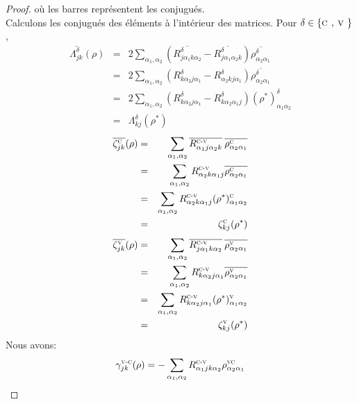 \documentclass[12pt,a4paper,openany,oneside]{book}
\begin{document}
{{{{{{\begin{proof}
  où les barres représentent les conjugués. \\
  Calculons les conjugués des éléments à l'intérieur des matrices.
  Pour $ \delta\in\{\textsc{c , v }\} $ ,
 \begin{eqnarray*}
\overline{\Lambda^{\delta}_{jk}}(\rho) & = & 2\sum_{\alpha_{1},\alpha_{2}}\left(\overline{R^{\delta}_{j\alpha_{1}k\alpha_{2}}}-\overline{R^{\delta}_{j\alpha_{1}\alpha_{2}k}}\right)\overline{\rho^{\delta}_{\alpha_{2}\alpha_{1}}}\\
& = & 2\sum_{\alpha_{1},\alpha_{2}}(R^{\delta}_{k\alpha_{2}j\alpha_{1}}-R^{\delta}_{\alpha_{2}kj\alpha_{1}})\overline{\rho^{\delta}_{\alpha_{2}\alpha_{1}}}\\ 
& = & 2\sum_{\alpha_{1},\alpha_{2}}(R^{\delta}_{k\alpha_{2}j\alpha_{1}}-R^{\delta}_{k\alpha_{2}\alpha_{1}j})(\rho^{*})^{\delta}_{\alpha_{1}\alpha_{2}}\\
 & = & \Lambda^{\delta}_{kj}(\rho^{*})
\end{eqnarray*}  
 \begin{eqnarray*}
\overline{\zeta^{\textsc{c}}_{jk}}(\rho) & = & \displaystyle\sum_{\alpha_{1},\alpha_{2}}\overline{R^{\textsc{c-v}}_{\alpha_{1}j\alpha_{2}k}}\:\overline{\rho^{\textsc{c}}_{\alpha_{2}\alpha_{1}}}\\
& = & \displaystyle\sum_{\alpha_{1},\alpha_{2}}R^{\textsc{c-v}}_{\alpha_{2}k\alpha_{1}j}\overline{\rho^{\textsc{c}}_{\alpha_{2}\alpha_{1}}}\\
& = & \displaystyle\sum_{\alpha_{1},\alpha_{2}}R^{\textsc{c-v}}_{\alpha_{2}k\alpha_{1}j}(\rho^{*})^{\textsc{c}}_{\alpha_{1}\alpha_{2}}\\
& = & \zeta^{\textsc{c}}_{kj}(\rho^{*})
\end{eqnarray*}   
%  
\begin{eqnarray*}
\overline{\zeta^{\textsc{v}}_{jk}}(\rho) & = & \displaystyle\sum_{\alpha_{1},\alpha_{2}}\overline{R^{\textsc{c-v}}_{j\alpha_{1}k\alpha_{2}}}\:\overline{\rho^{\textsc{v}}_{\alpha_{2}\alpha_{1}}}\\
& = & \displaystyle\sum_{\alpha_{1},\alpha_{2}}R^{\textsc{c-v}}_{k\alpha_{2}j\alpha_{1}}\overline{\rho^{\textsc{v}}_{\alpha_{2}\alpha_{1}}}\\
& = & \displaystyle\sum_{\alpha_{1},\alpha_{2}}R^{\textsc{c-v}}_{k\alpha_{2}j\alpha_{1}}(\rho^{*})^{\textsc{v}}_{\alpha_{1}\alpha_{2}}\\
& = & \zeta^{\textsc{v}}_{kj}(\rho^{*})
\end{eqnarray*} 
%
Nous avons:  
$$
\gamma^{\textsc{v-c}}_{jk}(\rho) = -\displaystyle\sum_{\alpha_{1},\alpha_{2}}R^{\textsc{c-v}}_{\alpha_{1}jk\alpha_{2}}\rho^{\textsc{vc}}_{\alpha_{2}\alpha_{1}}
$$
\end{proof}}}}}}}
\end{document}
